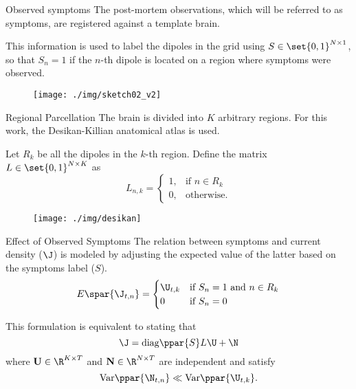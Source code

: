  {Observed symptoms}
The post-mortem observations, which will be referred to as  {symptoms}, are registered against a template brain. 

This information is used to label the dipoles in the grid using
${S\in \set{0,1}^{N\times 1}}$, so that $S_n = 1$ if the $n$-th dipole is located on a region where symptoms were observed.

\begin{figure}
\centering
\texttt{[image: ./img/sketch02\_v2]}
\end{figure}

 

 {Regional Parcellation}
The  brain is divided into $K$ arbitrary regions. For this work, the Desikan-Killian anatomical atlas is used.

Let $R_k$ be all the dipoles in the $k$-th region. Define the matrix $L\in \set{0,1}^{N\times K}$ as
\begin{equation}
    L_{n,k} = \begin{cases}
        1, &\text{if } n\in R_k \\
        0, &\text{otherwise.}
    \end{cases}
\end{equation}

\begin{figure}
\centering
\texttt{[image: ./img/desikan]}

\end{figure}

 

 {Effect of Observed Symptoms}
The relation between symptoms and current density ($\J$) is modeled by adjusting the expected value of the latter based on the symptoms label ($S$).
\begin{equation}
    E\spar{\J_{t,n}} = 
    \begin{cases}
        \U_{t,k} & \text{if } S_n=1 \text{ and } n\in R_k \\
        0 & \text{if } S_n=0
    \end{cases}
\end{equation}

This formulation is equivalent to stating that
\begin{equation}
    \J = \text{diag}\ppar{S} L \U + \N
\end{equation}
where $\mathbf{U}\in \R^{K\times T}$ and $\mathbf{N}\in \R^{N\times T}$ are independent and satisfy
\begin{equation}
    \text{Var}\ppar{\N_{t,n}} \ll \text{Var}\ppar{\U_{t,k}}.
\end{equation}
 

